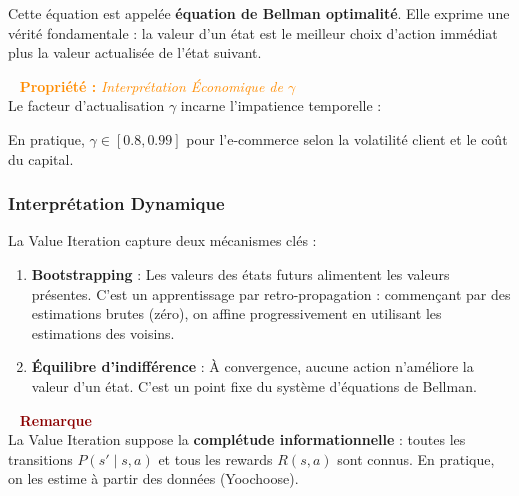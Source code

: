 \documentclass[11pt,a4paper]{article}
\newenvironment{propbox}[1]{%
  \vspace{3pt}\begin{framed}
  \noindent{\color{DarkOrange}\rule{0.3cm}{3pt}}~%
  \textcolor{DarkOrange}{\textbf{Propriété :} \textit{#1}}\\[3pt]}
  {\end{framed}\vspace{3pt}}
\newenvironment{warnbox}{%
  \vspace{3pt}\begin{framed}
  \noindent{\color{DarkRed}\rule{0.3cm}{3pt}}~%
  \textcolor{DarkRed}{\textbf{Remarque}}\\[3pt]}
  {\end{framed}\vspace{3pt}}
\begin{document}
Cette équation est appelée \textbf{équation de Bellman optimalité}. Elle exprime une vérité fondamentale : la valeur d'un état est le meilleur choix d'action immédiat plus la valeur actualisée de l'état suivant.

\begin{propbox}{Interprétation Économique de $\gamma$}
Le facteur d'actualisation $\gamma$ incarne l'impatience temporelle :

En pratique, $\gamma \in [0.8, 0.99]$ pour l'e-commerce selon la volatilité client et le coût du capital.
\end{propbox}


\subsubsection{Interprétation Dynamique}

La Value Iteration capture deux mécanismes clés :

\begin{enumerate}
\item \textbf{Bootstrapping} : Les valeurs des états futurs alimentent les valeurs présentes. C'est un apprentissage par retro-propagation : commençant par des estimations brutes (zéro), on affine progressivement en utilisant les estimations des voisins.

\item \textbf{Équilibre d'indifférence} : À convergence, aucune action n'améliore la valeur d'un état. C'est un point fixe du système d'équations de Bellman.
\end{enumerate}

\begin{warnbox}
La Value Iteration suppose la \textbf{complétude informationnelle} : toutes les transitions $P(s' \mid s, a)$ et tous les rewards $R(s,a)$ sont connus. En pratique, on les estime à partir des données (Yoochoose).
\end{warnbox}
\newpage
\end{document}
